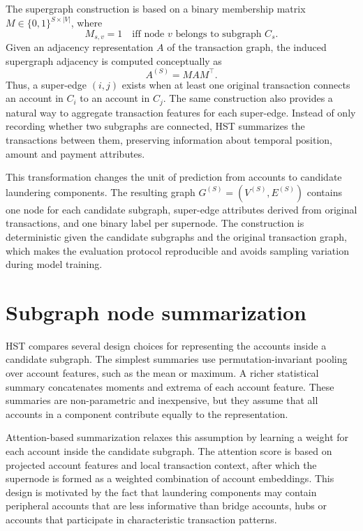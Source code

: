 \documentclass[12pt, twocolumn]{report}
\begin{document}
The supergraph construction is based on a binary membership matrix $M\in\{0,1\}^{S\times |V|}$, where
\begin{equation}
    M_{s,v} = 1 \quad \text{iff node } v \text{ belongs to subgraph } C_s .
\end{equation}
Given an adjacency representation $A$ of the transaction graph, the induced supergraph adjacency is computed conceptually as
\begin{equation}
    A^{(S)} = M A M^\top .
\end{equation}
Thus, a super-edge $(i,j)$ exists when at least one original transaction connects an account in $C_i$ to an account in $C_j$. The same construction also provides a natural way to aggregate transaction features for each super-edge. Instead of only recording whether two subgraphs are connected, HST summarizes the transactions between them, preserving information about temporal position, amount and payment attributes.

This transformation changes the unit of prediction from accounts to candidate laundering components. The resulting graph $G^{(S)}=(V^{(S)},E^{(S)})$ contains one node for each candidate subgraph, super-edge attributes derived from original transactions, and one binary label per supernode. The construction is deterministic given the candidate subgraphs and the original transaction graph, which makes the evaluation protocol reproducible and avoids sampling variation during model training.

\section{Subgraph node summarization}

HST compares several design choices for representing the accounts inside a candidate subgraph. The simplest summaries use permutation-invariant pooling over account features, such as the mean or maximum. A richer statistical summary concatenates moments and extrema of each account feature. These summaries are non-parametric and inexpensive, but they assume that all accounts in a component contribute equally to the representation.

Attention-based summarization relaxes this assumption by learning a weight for each account inside the candidate subgraph. The attention score is based on projected account features and local transaction context, after which the supernode is formed as a weighted combination of account embeddings. This design is motivated by the fact that laundering components may contain peripheral accounts that are less informative than bridge accounts, hubs or accounts that participate in characteristic transaction patterns.
\end{document}
